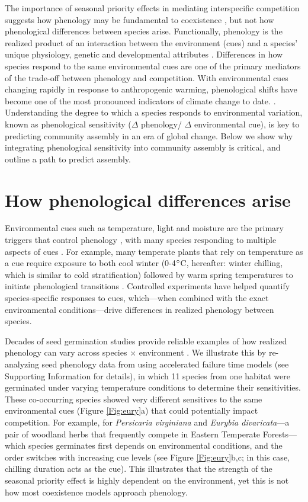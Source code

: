 \documentclass{article}[12pt]
\begin{document}
The importance of seasonal priority effects in mediating interspecific competition suggests how phenology may be fundamental to coexistence \citep{Diez_2024, Blackford_2020,Revilla:2014aa}, but not how phenological differences between species arise. Functionally, phenology is the realized product of an interaction between the environment (cues) and a species' unique physiology, genetic and developmental attributes \citep{DONOHUE2005}. Differences in how species respond to the same environmental cues are one of the primary mediators of the trade-off between phenology and competition. With environmental cues changing rapidly in response to anthropogenic warming, phenological shifts have become one of the most pronounced indicators of climate change to date.  \citep{ipcc2021}. Understanding the degree to which a species responds to environmental variation, known as phenological sensitivity ($\Delta$ phenology/ $\Delta$ environmental cue), is key to predicting community assembly in an era of global change. Below we show why integrating phenological sensitivity into community assembly is critical, and outline a path to predict assembly. %

\section{How phenological differences arise}
Environmental cues such as temperature, light and moisture are the primary triggers that control phenology \citep{Forrest2010}, with many species responding to multiple aspects of cues \citep{Lang:2025wf,Chuine2017}. For example, many temperate plants that rely on temperature as a cue require exposure to both cool winter (0-4$\degree$C, hereafter: winter chilling, which is similar to cold stratification) followed by warm spring temperatures to initiate phenological transitions \citep{Ettinger:2020aa}. Controlled experiments have helped quantify species-specific responses to cues, which---when combined with the exact environmental conditions---drive differences in realized phenology between species. 

Decades of seed germination studies provide reliable examples of how realized phenology can vary across species $\times$ environment \citep[e.g.,][]{ Pascual2021}. We illustrate this by re-analyzing seed phenology data from \citet{Buonaiuto2023data} using accelerated failure time models \citep{ONOFRI:2010tl} (see Supporting Information for details), in which 11 species from one habitat were germinated under varying temperature conditions to determine their sensitivities. These co-occurring species showed very different sensitives to the same environmental cues (Figure \ref{Fig:eury}a) that could potentially impact competition. For example, for \emph{Persicaria virginiana} and \emph{Eurybia divaricata}---a pair of woodland herbs that frequently compete in Eastern Temperate Forests---which species germinates first depends on environmental conditions, and the order switches with increasing cue levels (see Figure \ref{Fig:eury}b,c; in this case, chilling duration acts as the cue). This illustrates that the strength of the seasonal priority effect is highly dependent on the environment, yet this is not how most coexistence models approach phenology.
\end{document}

